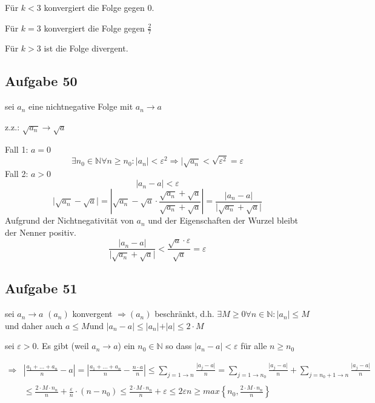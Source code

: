 \documentclass[11pt]{article}
\begin{document}
			Für $k<3$ konvergiert die Folge gegen $0$.
			
			Für $k=3$ konvergiert die Folge gegen $\frac{2}{7}$
			
			Für $k>3$ ist die Folge divergent.
			
		\subsection{Aufgabe 50}
			sei $a_n$ eine nichtnegative Folge mit $a_n \rightarrow a$
		
			z.z.: $\sqrt{a_n} \rightarrow \sqrt{a}$
			
			Fall 1: $a=0$
			\begin{displaymath}
				\exists n_0 \in \mathbb{N} \forall n \geq n_0 :\vert a_n\vert < \varepsilon^2 \Rightarrow \vert\sqrt{a_n}<\sqrt{\varepsilon^2}=\varepsilon
			\end{displaymath}
			Fall 2: $a>0$
			\begin{displaymath}
				\vert a_n-a\vert<\varepsilon
			\end{displaymath}
			\begin{displaymath}
				\vert\sqrt{a_n}-\sqrt{a}\vert=\left\vert \sqrt{a_n}-\sqrt{a}\cdot\frac{\sqrt{a_n}+\sqrt{a}}{\sqrt{a_n}+\sqrt{a}} \right\vert=\frac{\vert a_n-a\vert}{\vert\sqrt{a_n}+\sqrt{a}\vert}
			\end{displaymath}
			Aufgrund der Nichtnegativität von $a_n$ und der Eigenschaften der Wurzel bleibt der Nenner positiv.
			\begin{displaymath}
				\frac{\vert a_n-a\vert}{\vert\sqrt{a_n}+\sqrt{a}\vert}<\frac{\sqrt{a}\cdot\varepsilon}{\sqrt{a}}=\varepsilon
			\end{displaymath}
		
		\subsection{Aufgabe 51}
			sei $a_n \rightarrow a$
			$(a_n)$ konvergent $\Rightarrow (a_n)$ beschränkt, d.h. $\exists M\geq0 \forall n\in\mathbb{N}:\vert a_n\vert\leq M$ und daher auch $a\leq M$und $\vert a_n-a\vert\leq \vert a_n\vert+\vert a \vert \leq 2\cdot M$
			
			sei $\varepsilon>0$. Es gibt (weil $a_n \rightarrow a$) ein $n_0 \in\mathbb{N}$ so dass $\vert a_n-a\vert<\varepsilon$ für alle $n\geq n_0$
			
			\begin{displaymath}
				\begin{split}
				\Rightarrow &\left\vert \frac{a_1+...+a_n}{n}-a \right\vert = \left\vert \frac{a_1+...+a_n}{n}-\frac{n\cdot a}{n} \right\vert\leq \sum\limits_{j=1 \to n}\frac{\vert a_j-a\vert}{n}=\sum\limits_{j=1 \to n_0}\frac{\vert a_j-a\vert}{n}+\sum\limits_{j=n_0+1 \to n}\frac{\vert a_j-a\vert}{n}\\
				&\\
				&\leq\frac{2\cdot M\cdot n_n}{n}+\frac{\varepsilon}{n}\cdot (n-n_0)\leq \frac{2\cdot M\cdot n_n}{n}+\varepsilon \leq 2\varepsilon  n\geq max \left\{ n_0,\frac{2\cdot M\cdot n_n}{n} \right\}
				\end{split}
			\end{displaymath}
\end{document}
